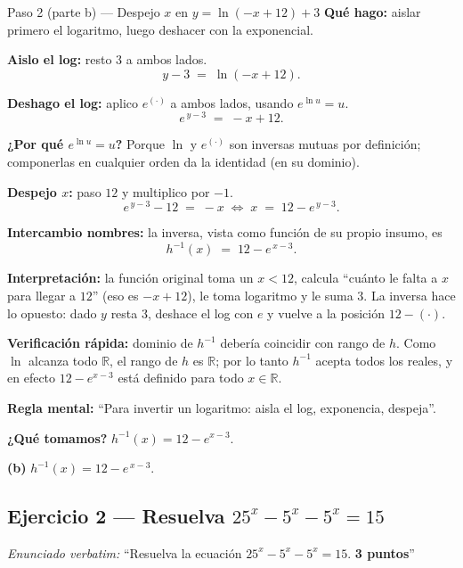 \documentclass[11pt]{article}
\begin{document}
\begin{paso}{Paso 2 (parte b) --- Despejo $x$ en $y=\ln(-x+12)+3$}
\textbf{Qué hago:} aislar primero el logaritmo, luego deshacer con la exponencial.

\textbf{Aislo el log:} resto $3$ a ambos lados.
\[
y-3 \;=\; \ln(-x+12).
\]

\textbf{Deshago el log:} aplico $e^{(\cdot)}$ a ambos lados, usando $e^{\ln u}=u$.
\[
e^{\,y-3} \;=\; -x+12.
\]

\textbf{¿Por qué $e^{\ln u}=u$?} Porque $\ln$ y $e^{(\cdot)}$ son inversas mutuas por definición; componerlas en cualquier orden da la identidad (en su dominio).

\textbf{Despejo $x$:} paso $12$ y multiplico por $-1$.
\[
e^{\,y-3} - 12 \;=\; -x \;\Longleftrightarrow\; x \;=\; 12 - e^{\,y-3}.
\]

\textbf{Intercambio nombres:} la inversa, vista como función de su propio insumo, es
\[
h^{-1}(x) \;=\; 12 - e^{\,x-3}.
\]

\textbf{Interpretación:} la función original toma un $x<12$, calcula ``cuánto le falta a $x$ para llegar a $12$'' (eso es $-x+12$), le toma logaritmo y le suma $3$. La inversa hace lo opuesto: dado $y$ resta $3$, deshace el log con $e$ y vuelve a la posición $12-(\cdot)$.

\textbf{Verificación rápida:} dominio de $h^{-1}$ debería coincidir con rango de $h$. Como $\ln$ alcanza todo $\mathbb{R}$, el rango de $h$ es $\mathbb{R}$; por lo tanto $h^{-1}$ acepta todos los reales, y en efecto $12-e^{x-3}$ está definido para todo $x\in\mathbb{R}$. \checkmark

\textbf{Regla mental:} ``Para invertir un logaritmo: aisla el log, exponencia, despeja''.

\textbf{¿Qué tomamos?} $h^{-1}(x)=12-e^{x-3}$.
\end{paso}

\begin{resp}
\textbf{(b)} $h^{-1}(x)=12-e^{\,x-3}$.
\end{resp}

\subsection*{Ejercicio 2 --- Resuelva $25^x-5^x-5^x=15$}

\textit{Enunciado verbatim:} ``Resuelva la ecuación $25^x-5^x-5^x=15$. \textbf{3 puntos}''
\end{document}
